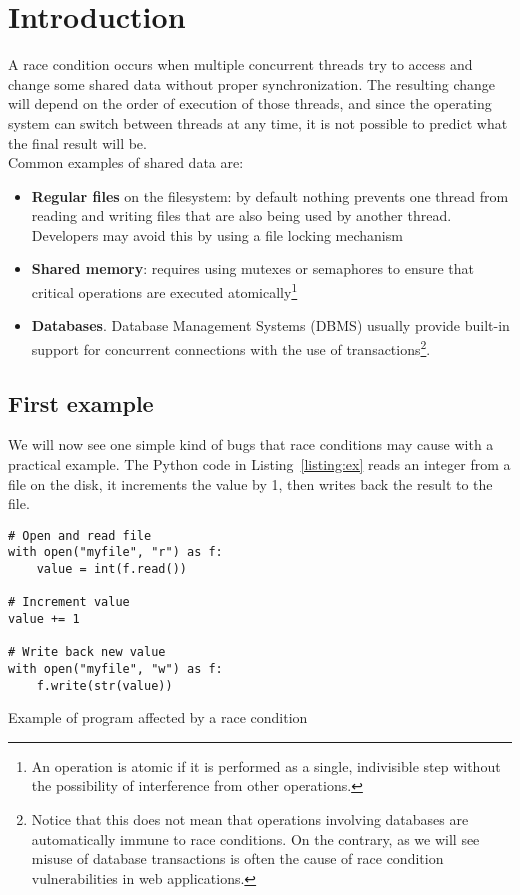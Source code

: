 \section{Introduction}

A race condition occurs when multiple concurrent threads try to access and change some shared data without proper synchronization. The resulting change will depend on the order of execution of those threads, and since the operating system can switch between threads at any time, it is not possible to predict what the final result will be.\\

Common examples of shared data are:
\begin{itemize}
  \item \textbf{Regular files} on the filesystem: by default nothing prevents one thread from reading and writing files that are also being used by another thread. Developers may avoid this by using a file locking mechanism
  \item \textbf{Shared memory}: requires using mutexes or semaphores to ensure that critical operations are executed atomically\footnote{An operation is atomic if it is performed as a single, indivisible step without the possibility of interference from other operations.}
  \item \textbf{Databases}. Database Management Systems (DBMS) usually provide built-in support for concurrent connections with the use of transactions\footnote{Notice that this does not mean that operations involving databases are automatically immune to race conditions. On the contrary, as we will see misuse of database transactions is often the cause of race condition vulnerabilities in web applications.}.
\end{itemize}

\subsection{First example}

We will now see one simple kind of bugs that race conditions may cause with a practical example. The Python code in Listing~\ref{listing:ex} reads an integer from a file on the disk, it increments the value by 1, then writes back the result to the file.

\begin{listing}[H]
\begin{verbatim}
# Open and read file
with open("myfile", "r") as f:
    value = int(f.read())

# Increment value
value += 1

# Write back new value
with open("myfile", "w") as f:
    f.write(str(value))
\end{verbatim}
\caption{Example of program affected by a race condition}
\label{listing:ex}
\end{listing}

